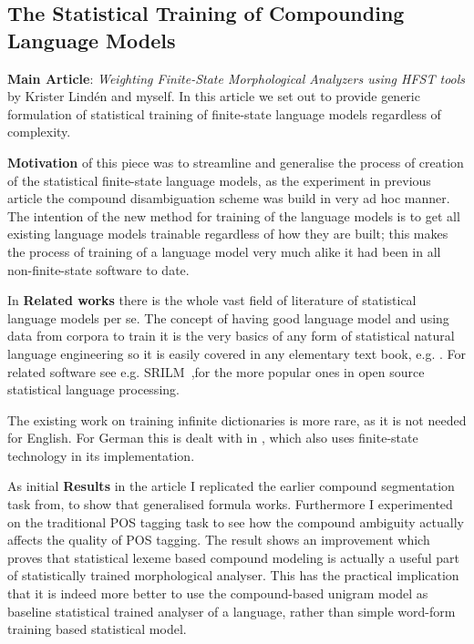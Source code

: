 \documentclass[officiallayout]{unihelcompling}
\begin{document}
\subsection{The Statistical Training of Compounding Language Models}

\textbf{Main Article}: \emph{Weighting Finite-State Morphological Analyzers
using HFST tools} by Krister Lindén and myself. In this article we set out
to provide generic formulation of statistical training of finite-state
language models regardless of complexity.

\textbf{Motivation} of this piece was to streamline and generalise the process
of creation of the statistical finite-state language models, as the experiment
in previous article \citep{pirinen2009weighted} the compound disambiguation
scheme was build in very ad hoc manner. The intention of the new method
for training of the language models is to get all existing language models
trainable regardless of how they are built; this makes the process of training
of a language model very much alike it had been in all non-finite-state
software to date.

In \textbf{Related works} there is the whole vast field of literature of
statistical language models per se. The concept of having good language model
and using data from corpora to train it is the very basics of any form of
statistical natural language engineering so it is easily covered in any
elementary text book, e.g. \citep{noppakirja}. For related software see e.g.
SRILM~\citep{stolcke2002srilm},for the more popular ones in open source
statistical language processing.

The existing work on training infinite dictionaries is more rare, as it is not
needed for English. For German this is dealt with in \citep{schiller2006german},
which also uses finite-state technology in its implementation.

As initial \textbf{Results} in the article I replicated the earlier compound
segmentation task from, to show that generalised formula works.
Furthermore I experimented on the traditional POS tagging task to see how the
compound ambiguity actually affects the quality of POS tagging. The result
shows an improvement which proves that statistical lexeme based compound
modeling is actually a useful part of statistically trained morphological
analyser. This has the practical implication that it is indeed more better to
use the compound-based unigram model as baseline statistical trained analyser
of a language, rather than simple word-form training based statistical model.
\end{document}
